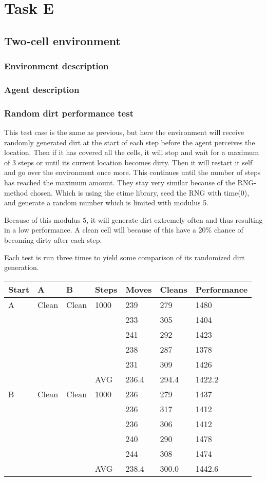 
\section{Task E}
\subsection{Two-cell environment}
\subsubsection{Environment description}
\subsubsection{Agent description}

\subsubsection{Random dirt performance test}
This test case is the same as previous, but here the environment will receive
randomly generated dirt at the start of each step before the agent perceives the
location.  Then if it has covered all the cells, it will stop and wait for
a maximum of 3 steps or until its current location becomes dirty. Then it will
restart it self and go over the environment once more. This continues until the
number of steps has reached the maximum amount.  They stay very similar because
of the RNG-method chosen. Which is using the ctime library, seed the RNG with
time(0), and generate a random number which is limited with modulus 5.

Because of this modulus 5, it will generate dirt extremely often and thus
resulting in a low performance.  A clean cell will because of this have a 20\%
chance of becoming dirty after each step.

Each test is run three times to yield some comparison of its randomized dirt
generation.

\begin{longtable}{p{} p{} p{} 
									p{} p{} p{} 
									p{}}
Start	& A & B & Steps & Moves & Cleans & Performance \\\hline
A & Clean & Clean & 1000 
		 & 239 & 279 & 1480 \\
	&&&& 233 & 305 & 1404 \\
	&&&& 241 & 292 & 1423 \\
	&&&& 238 & 287 & 1378 \\
	&&&& 231 & 309 & 1426 \\\hline
  &&& AVG & 236.4 & 294.4 & 1422.2\\\hline

B & Clean & Clean & 1000 
		 & 236 & 279 & 1437 \\
	&&&& 236 & 317 & 1412 \\
	&&&& 236 & 306 & 1412 \\
	&&&& 240 & 290 & 1478 \\
	&&&& 244 & 308 & 1474 \\\hline
  &&& AVG & 238.4 & 300.0 & 1442.6 \\\hline
\end{longtable}

